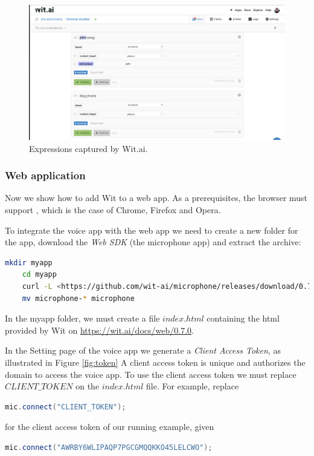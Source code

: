 \begin{figure}[!h]
\begin{center}
    \includegraphics[width=\textwidth]{figures/expressions.png}
    \caption{Expressions captured by Wit.ai.}
    \label{fig:expressions}
\end{center}
\end{figure}

\subsubsection{Web application}
\label{sec:web}

Now we show how to add Wit to a web app.
As a prerequisites, the browser must support \cite{webrtc}, which is the case of Chrome, Firefox and Opera.

To integrate the voice app with the web app we need to create a new folder for the app, download the \emph{Web SDK} (the microphone app) and extract the archive:
\begin{lstlisting}[language=bash]
	mkdir myapp
	cd myapp
	curl -L <https://github.com/wit-ai/microphone/releases/download/0.7.0/microphone-0.7.0.tar.gz | tar xvzf -
	mv microphone-* microphone
\end{lstlisting}

In the myapp folder, we must create a file $index.html$ containing the html provided by Wit on \url{https://wit.ai/docs/web/0.7.0}.

In the Setting page of the voice app we generate a \emph{Client Access Token}, as illustrated in Figure \ref{fig:token} 
A client access token is unique and authorizes the domain to access the voice app. 
To use the client access token we must replace $CLIENT\_TOKEN$ on the $index.html$ file.
For example, replace 
\begin{lstlisting}[language=java]
	mic.connect("CLIENT_TOKEN");
\end{lstlisting}
for the client access token of our running example, given
\begin{lstlisting}[language=java]
	mic.connect("AWRBY6WLIPAQP7PGCGMQQKKO45LELCWO");
\end{lstlisting}

